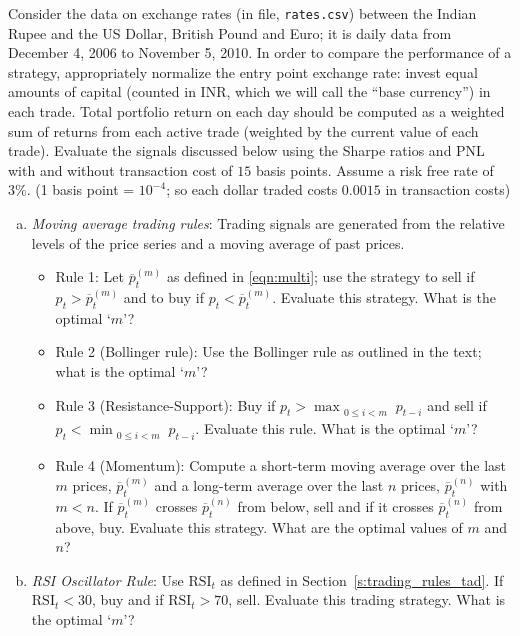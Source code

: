  Consider the data on exchange rates (in file, \texttt{rates.csv}) between the Indian Rupee and the US Dollar, British Pound and Euro; it is daily data from December 4, 2006 to November 5, 2010. In order to compare the performance of a strategy, appropriately normalize the entry point exchange rate: invest equal amounts of capital (counted in INR, which we will call the ``base currency'') in each trade. Total portfolio return on each day should be computed as a weighted sum of returns from each active trade (weighted by the current value of each trade). Evaluate the signals discussed below using the Sharpe ratios and PNL with and without transaction cost of $15$ basis points. Assume a risk free rate of $3\%$. (1 basis point = $10^{-4}$; so each dollar traded costs $0.0015$ in transaction costs)
	\begin{enumerate}[(a)]
	\item{\it Moving average trading rules}: Trading signals are generated from the relative levels of the price series and a moving average of past prices.
		\begin{itemize}
		\item  Rule 1: Let $\overline{p}_t^{(m)}$ as defined in \eqref{eqn:multi}; use the strategy to sell if $p_t>\overline{p}_t^{(m)}$ and to buy if  $p_t<\overline{p}_t^{(m)}$. Evaluate this strategy. What is the optimal `$m$'?
		\item Rule 2 (Bollinger rule): Use the Bollinger rule as outlined in the text; what is the optimal `$m$'?
		\item Rule 3 (Resistance-Support): Buy if $p_t > \max_{\substack{0 \leq i< m}} p_{t-i}$ and sell if $p_t < \min_{\substack{0 \leq i < m}} p_{t-i}$. Evaluate this rule. What is the optimal `$m$'?
		\item Rule 4 (Momentum): Compute a short-term moving average over the last $m$ prices, $\overline{p}_t^{(m)}$ and a long-term average over the last $n$ prices, $\overline{p}_t^{(n)}$ with $m<n$. If $\overline{p}_t^{(m)}$ crosses $\overline{p}_t^{(n)}$ from below, sell and if it crosses $\overline{p}_t^{(n)}$ from above, buy. Evaluate this strategy. What are the optimal values of $m$ and $n$?
		\end{itemize}
	\item{\it RSI Oscillator Rule}: Use $\text{RSI}_t$ as defined in Section~\ref{s:trading_rules_tad}. \hfill \break
If $\text{RSI}_t<30$, buy and if $\text{RSI}_t>70$, sell. Evaluate this trading strategy. What is the optimal `$m$'?


\end{enumerate}

